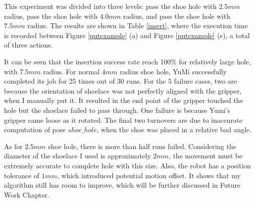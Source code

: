 This experiment was divided into three levels: pass the shoe hole with $2.5mm$ radius, pass the shoe hole with $4.0mm$ radius, and pass the shoe hole with $7.5mm$ radius. The results are shown in Table \ref{insert}, where the execution time is recorded between Figure \ref{putexample} (a) and Figure \ref{putexample} (e), a total of three actions. 

\begin{table}[H]
\centering
{}
\caption{The testing results of shoelace insertion}
\label{insert}
\end{table}

It can be seen that the insertion success rate reach 100\% for relatively large hole, with $7.5mm$ radius. For normal $4mm$ radius shoe hole, YuMi successfully completed its job for 25 times out of 30 runs. For the 5 failure cases, two are because the orientation of shoelace was not perfectly aligned with the gripper, when I manually put it. It resulted in the end point of the gripper touched the hole but the shoelace failed to pass through. One failure is because Yumi's gripper came loose as it rotated. The final two turnovers are due to inaccurate computation of pose $shoe\_hole$, when the shoe was placed in a relative bad angle.

As for $2.5mm$ shoe hole, there is more than half runs failed. Considering the diameter of the shoelace I used is approximately $2mm$, the movement must be extremely accurate to complete hole with this size. Also, the robot has a position tolerance of $1mm$, which introduced potential motion offset. It shows that my algorithm still has room to improve, which will be further discussed in Future Work Chapter.


